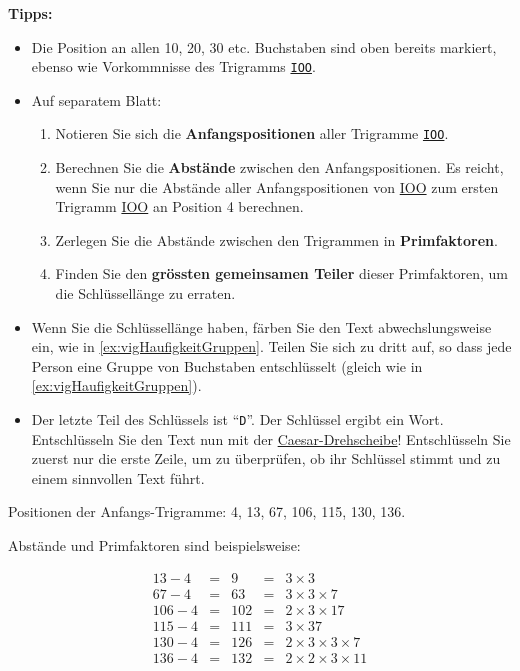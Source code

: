\begin{myexercise}
\textbf{Tipps:}
\begin{itemize}
\item Die Position an allen 10, 20, 30 etc. Buchstaben sind oben bereits markiert, ebenso wie Vorkommnisse des Trigramms \underline{\texttt{IOO}}.
\item Auf separatem Blatt:
\begin{enumerate}
\item Notieren Sie sich die \textbf{Anfangspositionen} aller Trigramme \underline{\texttt{IOO}}. 
\item Berechnen Sie die \textbf{Abstände} zwischen den Anfangspositionen. Es reicht, wenn Sie nur die Abstände aller Anfangspositionen von \underline{IOO} zum ersten Trigramm \underline{IOO} an Position 4 berechnen.
\item Zerlegen Sie die Abstände zwischen den Trigrammen in \textbf{Primfaktoren}.
\item Finden Sie den \textbf{grössten gemeinsamen Teiler} dieser Primfaktoren, um die Schlüssellänge zu erraten.
\end{enumerate}
\item Wenn Sie die Schlüssellänge haben, färben Sie den Text abwechslungsweise ein, wie in \cref{ex:vigHaufigkeitGruppen}. Teilen Sie sich zu dritt auf, so dass jede Person eine Gruppe von Buchstaben entschlüsselt (gleich wie in \cref{ex:vigHaufigkeitGruppen}).
\item Der letzte Teil des Schlüssels ist ``\texttt{D}''. Der Schlüssel ergibt ein Wort. Entschlüsseln Sie den Text nun mit der \href{https://naokipeter.gitlab.io/caesar/}{Caesar-Drehscheibe}! Entschlüsseln Sie zuerst nur die erste Zeile, um zu überprüfen, ob ihr Schlüssel stimmt und zu einem sinnvollen Text führt.
\end{itemize}
\begin{myanswer}
Positionen der Anfangs-Trigramme: 4, 13, 67, 106, 115, 130, 136.

Abstände und Primfaktoren sind beispielsweise:

\begin{align*}
13-4 &=& 9 &=& 3\times3\\
67-4 &=& 63 &=& 3\times3\times7\\
106-4 &=& 102 &=& 2\times3\times17\\
115-4 &=& 111 &=& 3\times37\\
130-4 &=& 126 &=& 2\times3\times3\times7\\
136-4 &=& 132 &=& 2\times2\times3\times11\\
\end{align*}


\end{myanswer}
\end{myexercise}
